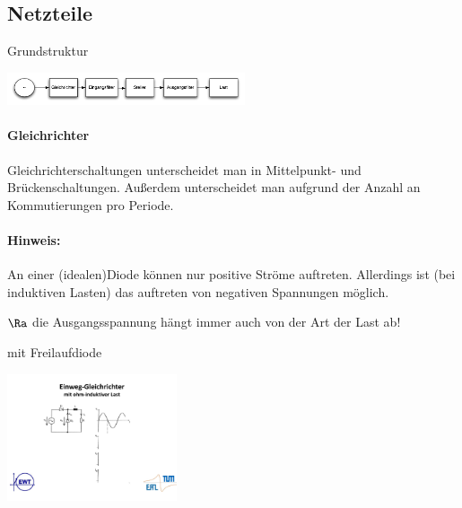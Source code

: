 \documentclass[fs, footer]{latex4ei}
\begin{document}
\begin{multicols*}{4}
{\subsection{Netzteile}

Grundstruktur

\includegraphics[width=7cm]{img/03-Grundstruktur.pdf}

\paragraph{Gleichrichter} 
Gleichrichterschaltungen unterscheidet man in Mittelpunkt- und Brückenschaltungen. Außerdem unterscheidet man aufgrund der Anzahl an Kommutierungen pro Periode.



\paragraph{Hinweis:}
An einer (idealen)Diode können nur positive Ströme auftreten. Allerdings ist (bei induktiven Lasten) das auftreten von negativen Spannungen möglich.

$\Ra$ die Ausgangsspannung hängt immer auch von der Art der Last ab!

mit Freilaufdiode

\begin{center}
	\includegraphics[width=5cm]{img/03-mit_Freilauf.pdf}
\end{center}
}

\end{multicols*}
\end{document}
